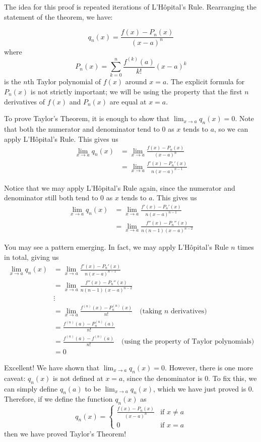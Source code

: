\documentclass{article}
\begin{document}
The idea for this proof is repeated iterations of L'Hôpital's Rule. Rearranging the statement of the theorem, we have:

$$
q_n(x) = \frac{f(x) - P_{n}(x)}{(x-a)^n}
$$
where
$$
P_n(x) = \sum_{k=0}^{n} \frac{f^{(k)}(a)}{k!} (x-a)^k
$$
is the $n$th Taylor polynomial of $f(x)$ around $x=a$. The explicit formula for $P_n(x)$ is not strictly important; we will be using the property that the first $n$ derivatives of $f(x)$ and $P_n(x)$ are equal at $x=a$.

To prove Taylor's Theorem, it is enough to show that $\lim_{x \to a} q_n(x) = 0$. Note that both the numerator and denominator tend to 0 as $x$ tends to $a$, so we can apply L'Hôpital's Rule. This gives us
\begin{align*}
\lim_{x \to a} q_n(x)
    &= \lim_{x \to a} \frac{f(x) - P_{n}(x)}{(x-a)^n} \\
    &= \lim_{x \to a} \frac{f'(x) - P_{n}'(x)}{n(x-a)^{n-1}}
\end{align*}

Notice that we may apply L'Hôpital's Rule again, since the numerator and denominator still both tend to 0 as $x$ tends to $a$. This gives us
\begin{align*}
\lim_{x \to a} q_n(x)
    &= \lim_{x \to a} \frac{f'(x) - P_{n}'(x)}{n(x-a)^{n-1}} \\
    &= \lim_{x \to a} \frac{f''(x) - P_{n}''(x)}{n(n-1)(x-a)^{n-2}}
\end{align*}

You may see a pattern emerging. In fact, we may apply L'Hôpital's Rule $n$ times in total, giving us
\begin{align*}
\lim_{x \to a} q_n(x)
    &= \lim_{x \to a} \frac{f'(x) - P_{n}'(x)}{n(x-a)^{n-1}} \\
    &= \lim_{x \to a} \frac{f''(x) - P_{n}''(x)}{n(n-1)(x-a)^{n-2}} \\
    &\vdots \\
    &= \lim_{x \to a} \frac{f^{(n)}(x) - P_{n}^{(n)}(x)}{n!} \quad \text{(taking $n$ derivatives)} \\
    &= \frac{f^{(n)}(a) - P_{n}^{(n)}(a)}{n!} \\
    &= \frac{f^{(n)}(a) - f^{(n)}(a)}{n!} \quad \text{(using the property of Taylor polynomials)} \\
    &= 0
\end{align*}

Excellent! We have shown that $\lim_{x \to a} q_n(x) = 0$. However, there is one more caveat: $q_n(x)$ is not defined at $x=a$, since the denominator is $0$. To fix this, we can simply define $q_n(a)$ to be $\lim_{x \to a} q_n(x)$, which we have just proved is $0$. Therefore, if we define the function $q_n(x)$ as
$$
q_n(x) =
\begin{cases}
    \frac{f(x) - P_{n}(x)}{(x-a)^n} & \text{if } x \neq a \\
    0 & \text{if } x = a
\end{cases}
$$
then we have proved Taylor's Theorem!
\end{document}
